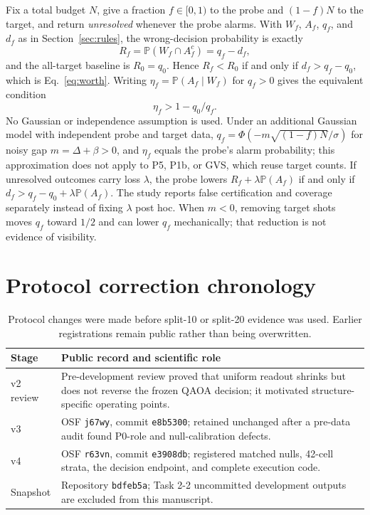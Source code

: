 \documentclass[10pt,twocolumn]{article}
\newcommand{\Prb}{\mathbb{P}}
\newcommand{\code}[1]{\texttt{#1}}
\begin{document}
Fix a total budget $N$, give a fraction $f\in[0,1)$ to the probe and
$(1-f)N$ to the target, and return \emph{unresolved} whenever the probe alarms.
With $W_f$, $A_f$, $q_f$, and $d_f$ as in Section~\ref{sec:rules}, the wrong-decision
probability is exactly
\begin{equation}
  R_f=\Prb(W_f\cap A_f^{c})=q_f-d_f,
\end{equation}
and the all-target baseline is $R_0=q_0$. Hence $R_f<R_0$ if and only if
$d_f>q_f-q_0$, which is Eq.~\eqref{eq:worth}. Writing
$\eta_f=\Prb(A_f\mid W_f)$ for $q_f>0$ gives the equivalent condition
\begin{equation}
  \eta_f>1-q_0/q_f.
\end{equation}
No Gaussian or independence assumption is used. Under an additional Gaussian
model with independent probe and target data, $q_f=\Phi(-m\sqrt{(1-f)N}/\sigma)$
for noisy gap $m=\Delta+\beta>0$, and $\eta_f$ equals the probe's alarm
probability; this approximation does not apply to P5, P1b, or GVS, which reuse
target counts. If unresolved outcomes carry loss $\lambda$, the probe lowers
$R_f+\lambda\Prb(A_f)$ if and only if $d_f>q_f-q_0+\lambda\Prb(A_f)$. The study
reports false certification and coverage separately instead of fixing
$\lambda$ post hoc. When $m<0$, removing target shots moves $q_f$ toward $1/2$
and can lower $q_f$ mechanically; that reduction is not evidence of
visibility.

\section{Protocol correction chronology}

\begin{table}[h]
\centering
\caption{Protocol changes were made before split-10 or split-20 evidence was
used. Earlier registrations remain public rather than being overwritten.}
\begin{tabularx}{\columnwidth}{@{}p{}X@{}}
\toprule
Stage & Public record and scientific role \\
\midrule
v2 review & Pre-development review proved that uniform readout shrinks but does not reverse the frozen QAOA decision; it motivated structure-specific operating points. \\
v3 & OSF \code{j67wy}, commit \code{e8b5300}; retained unchanged after a pre-data audit found P0-role and null-calibration defects. \\
v4 & OSF \code{r63vn}, commit \code{e3908db}; registered matched nulls, 42-cell strata, the decision endpoint, and complete execution code. \\
Snapshot & Repository \code{bdfeb5a}; Task 2-2 uncommitted development outputs are excluded from this manuscript. \\
\bottomrule
\end{tabularx}
\end{table}
\end{document}
